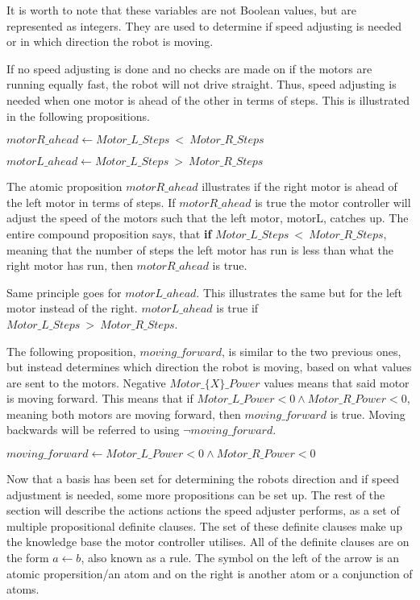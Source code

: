 It is worth to note that these variables are not Boolean values, but are represented as integers. They are used to determine if speed adjusting is needed or in which direction the robot is moving.

If no speed adjusting is done and no checks are made on if the motors are running equally fast, the robot will not drive straight. Thus, speed adjusting is needed when one motor is ahead of the other in terms of steps. This is illustrated in the following propositions.

\hspace{3mm} $motorR\_ahead \leftarrow Motor\_L\_Steps~<~Motor\_R\_Steps$

\hspace{3mm} $motorL\_ahead \leftarrow Motor\_L\_Steps~>~Motor\_R\_Steps$ 

The atomic proposition $motorR\_ahead$ illustrates if the right motor is ahead of the left motor in terms of steps. If $motorR\_ahead$ is true the motor controller will adjust the speed of the motors such that the left motor, motorL, catches up. The entire compound proposition says, that \textbf{if} $Motor\_L\_Steps~<~Motor\_R\_Steps$, meaning that the number of steps the left motor has run is less than what the right motor has run, then $motorR\_ahead$ is true.

Same principle goes for $motorL\_ahead$. This illustrates the same but for the left motor instead of the right. $motorL\_ahead$ is true if $Motor\_L\_Steps~>~Motor\_R\_Steps$.

The following proposition, $moving\_forward$, is similar to the two previous ones, but instead determines which direction the robot is moving, based on what values are sent to the motors. Negative $Motor\_\{X\}\_Power$ values means that said motor is moving forward. This means that if $Motor\_L\_Power < 0 \land Motor\_R\_Power < 0$, meaning both motors are moving forward, then $moving\_forward$ is true. Moving backwards will be referred to using $\lnot moving\_forward$.

\hspace{3mm} $moving\_forward \leftarrow Motor\_L\_Power < 0 \land Motor\_R\_Power < 0$

Now that a basis has been set for determining the robots direction and if speed adjustment is needed, some more propositions can be set up. The rest of the section will describe the actions actions the speed adjuster performs, as a set of multiple propositional definite clauses. The set of these definite clauses make up the knowledge base the motor controller utilises. All of the definite clauses are on the form $a \leftarrow b$, also known as a rule. The symbol on the left of the arrow is an atomic propersition/an atom and on the right is another atom or a conjunction of atoms.

